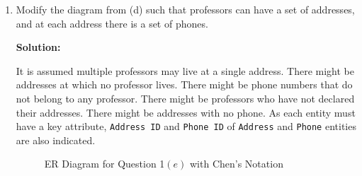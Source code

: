 \begin{enumerate}[label=(\alph*)]
\item Modify the diagram from (d) such that professors can have a set of addresses, and at each address there is a set of phones.

\textbf{Solution:}

It is assumed multiple professors may live at a single address. There might be addresses at which no professor lives. There might be phone numbers that do not belong to any professor. There might be professors who have not declared their addresses. There might be addresses with no phone. As each entity must have a key attribute, \texttt{Address ID} and \texttt{Phone ID} of \texttt{Address} and \texttt{Phone} entities are also indicated.

\begin{figure}[H]\centering

\caption{ER Diagram for Question 1$\left(e\right)$ with Chen's Notation} \label{fig:ER5}
\end{figure}

\end{enumerate}
